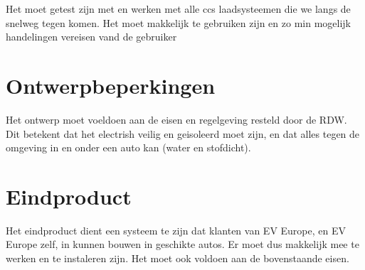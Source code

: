 Het moet getest zijn met en werken met alle ccs laadsysteemen die we langs de
snelweg tegen komen. Het moet makkelijk te gebruiken zijn en zo min mogelijk
handelingen vereisen vand de gebruiker

\section{Ontwerpbeperkingen}

Het ontwerp moet voeldoen aan de eisen en regelgeving resteld door de RDW. Dit
betekent dat het electrish veilig en geisoleerd moet zijn, en dat alles tegen
de omgeving in en onder een auto kan (water en stofdicht).

\section{Eindproduct}

Het eindproduct dient een systeem te zijn dat klanten van EV Europe, en EV
Europe zelf, in kunnen bouwen in geschikte autos. Er moet dus makkelijk mee te
werken en te instaleren zijn. Het moet ook voldoen aan de bovenstaande eisen.
